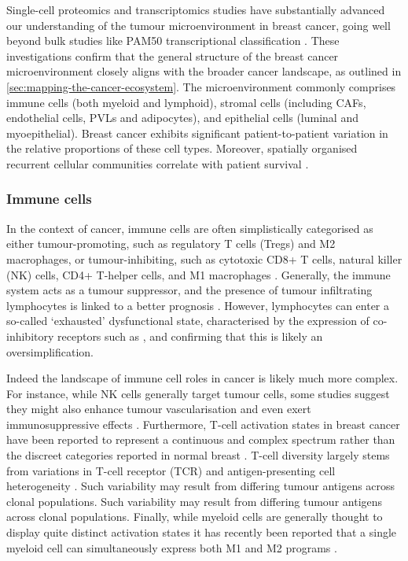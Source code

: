 Single-cell proteomics and transcriptomics studies have substantially advanced our understanding of the tumour microenvironment in breast cancer, going well beyond bulk studies like PAM50 transcriptional classification \parencite{Wu2021-uq,Pal2021-rf,Wagner2019-zp}. These investigations confirm that the general structure of the breast cancer microenvironment closely aligns with the broader cancer landscape, as outlined in \cref{sec:mapping-the-cancer-ecosystem}. The microenvironment commonly comprises immune cells (both myeloid and lymphoid), stromal cells (including \acfp{CAF}, endothelial cells, \acfp{PVL} and adipocytes), and epithelial cells (luminal and myoepithelial). Breast cancer exhibits significant patient-to-patient variation in the relative proportions of these cell types. Moreover, spatially organised recurrent cellular communities correlate with patient survival \parencite{Jackson2020-em, Danenberg2022-zb}.

\subsubsection*{Immune cells}

In the context of cancer, immune cells are often simplistically categorised as either tumour-promoting, such as regulatory T cells (Tregs) and M2 macrophages, or tumour-inhibiting, such as cytotoxic CD8+ T cells, natural killer (NK) cells, CD4+ T-helper cells, and M1 macrophages . Generally, the immune system acts as a tumour suppressor, and the presence of tumour infiltrating lymphocytes is linked to a better prognosis . However, lymphocytes can enter a so-called `exhausted' dysfunctional state, characterised by the expression of co-inhibitory receptors such as ,  and  confirming that this is likely an oversimplification.

Indeed the landscape of immune cell roles in cancer is likely much more complex. For instance, while NK cells generally target tumour cells, some studies suggest they might also enhance tumour vascularisation and even exert immunosuppressive effects \parencite{Retecki2021-se}. Furthermore, T-cell activation states in breast cancer have been reported to represent a continuous and complex spectrum  rather than the discreet categories reported in normal breast  \parencite{Azizi2018-vc,Savas2018-vb}. T-cell diversity largely stems from variations in T-cell receptor (TCR) and antigen-presenting cell heterogeneity \parencite{Azizi2018-vc}. Such variability may result from differing tumour antigens across clonal populations. Such variability may result from differing tumour antigens across clonal populations. Finally, while myeloid cells are generally thought to display quite distinct activation states it has recently been reported that a single myeloid cell can simultaneously express both M1 and M2 programs \parencite{Azizi2018-vc}. 

